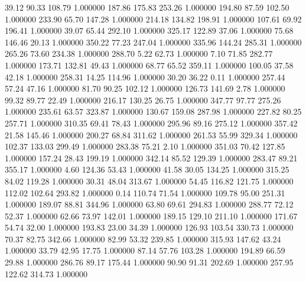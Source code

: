      39.12     90.33    108.79  1.000000
    187.86    175.83    253.26  1.000000
    194.80     87.59    102.50  1.000000
    233.90     65.70    147.28  1.000000
    214.18    134.82    198.91  1.000000
    107.61     69.92    196.41  1.000000
     39.07     65.44    292.10  1.000000
    325.17    122.89     37.06  1.000000
     75.68    146.46     20.13  1.000000
    350.22     77.23    247.04  1.000000
    335.96    144.24    285.31  1.000000
    265.26     73.60    234.38  1.000000
    288.70      5.22     62.73  1.000000
      7.10     71.85    282.77  1.000000
    173.71    132.81     49.43  1.000000
     68.77     65.52    359.11  1.000000
    100.05     37.58     42.18  1.000000
    258.31     14.25    114.96  1.000000
     30.20     36.22      0.11  1.000000
    257.44     57.24     47.16  1.000000
     81.70     90.25    102.12  1.000000
    126.73    141.69      2.78  1.000000
     99.32     89.77     22.49  1.000000
    216.17    130.25     26.75  1.000000
    347.77     97.77    275.26  1.000000
    235.61     63.57    323.87  1.000000
    130.67    159.08    287.98  1.000000
    227.82     80.25    257.71  1.000000
    310.35     69.41     78.43  1.000000
    295.96     89.16    275.12  1.000000
    357.42     21.58    145.46  1.000000
    200.27     68.84    311.62  1.000000
    261.53     55.99    329.34  1.000000
    102.37    133.03    299.49  1.000000
    283.38     75.21      2.10  1.000000
    351.03     70.42    127.85  1.000000
    157.24     28.43    199.19  1.000000
    342.14     85.52    129.39  1.000000
    283.47     89.21    355.17  1.000000
      4.60    124.36     53.43  1.000000
     41.58     30.05    134.25  1.000000
    315.25     84.02    119.28  1.000000
     30.31     48.04    313.67  1.000000
     54.45    116.82    121.75  1.000000
    112.02    102.64    293.82  1.000000
      0.14    110.74     71.54  1.000000
    109.78     95.00    251.31  1.000000
    189.07     88.81    344.96  1.000000
     63.80     69.61    294.83  1.000000
    288.77     72.12     52.37  1.000000
     62.66     73.97    142.01  1.000000
    189.15    129.10    211.10  1.000000
    171.67     54.74     32.00  1.000000
    193.83     23.00     34.39  1.000000
    126.93    103.54    330.73  1.000000
     70.37     82.75    342.66  1.000000
     82.99     53.32    239.85  1.000000
    315.93    147.62     43.24  1.000000
     33.79     42.95     17.75  1.000000
     87.14     57.76    103.28  1.000000
    194.89     66.59     29.88  1.000000
    286.76     89.17    175.44  1.000000
     90.90     91.31    202.69  1.000000
    257.95    122.62    314.73  1.000000

